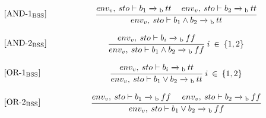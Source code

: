 \begin{equation}
\begin{minipage}{.2\linewidth}
$[\text{AND-1}_\text{BSS}]$
\end{minipage}
\begin{minipage}{.8\linewidth}
\centering
$\cfrac{env_v, \: sto \vdash b_1 \xrightarrow{}\textsubscript{b} \: tt \quad\: env_v, \: sto \vdash b_2 \xrightarrow{}\textsubscript{b} \: tt}{env_v, \: sto \vdash b_1 \wedge b_2 \xrightarrow{}\textsubscript{b} \: tt}$
\end{minipage}
\end{equation}

\begin{equation}
\begin{minipage}{.2\linewidth}
$[\text{AND-2}_\text{BSS}]$
\end{minipage}
\begin{minipage}{.8\linewidth}
\centering
$\cfrac{env_v, \: sto \vdash b_i \xrightarrow{}\textsubscript{b} \: ff }{env_v, \: sto \vdash b_1 \wedge b_2 \xrightarrow{}\textsubscript{b} \: ff}$
$i \: \in \: \{1,2\}$
\end{minipage}
\end{equation}

\begin{equation}
\begin{minipage}{.2\linewidth}
$[\text{OR-1}_\text{BSS}]$
\end{minipage}
\begin{minipage}{.8\linewidth}
\centering
$\cfrac{env_v, \: sto \vdash b_i \xrightarrow{}\textsubscript{b} \: tt }{env_v, \: sto \vdash b_1 \vee b_2 \xrightarrow{}\textsubscript{b} \: tt}$
$i \: \in \: \{1,2\}$
\end{minipage}
\end{equation}

\begin{equation}
\begin{minipage}{.2\linewidth}
$[\text{OR-2}_\text{BSS}]$
\end{minipage}
\begin{minipage}{.8\linewidth}
\centering
$\cfrac{env_v, \: sto \vdash b_1 \xrightarrow{}\textsubscript{b} \: ff \: \: \: \: \: \: env_v, \: sto \vdash b_2 \xrightarrow{}\textsubscript{b} \: ff}{env_v, \: sto \vdash b_1 \vee b_2 \xrightarrow{}\textsubscript{b} \: ff}$
\end{minipage}
\end{equation}





